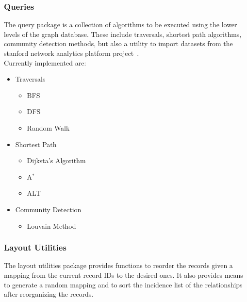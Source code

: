    \subsubsection{Queries}
        The query package is a collection of algorithms to be executed using the lower levels of the graph database. These include traversals, shortest path algorithms, community detection methods, but also a utility to import datasets from the stanford network analytics platform project~\autocite{snap}. \\
        Currently implemented are:
        \begin{itemize}
         \item Traversals
         \begin{itemize}
                \item BFS~\autocite{zuse1948allgemeinen}
                \item DFS~\autocite{lucas1891recreations}
                \item Random Walk~\autocite{pearson1905problem}
               \end{itemize}
         \item Shortest Path
         \begin{itemize}
          \item Dijksta's Algorithm~\autocite{dijkstra1959note}
          \item A$^*$~\autocite{hart1968formal}
          \item ALT~\autocite{goldberg2005computing}
         \end{itemize}
        \item Community Detection
        \begin{itemize}
         \item Louvain Method~\autocite{blondel2008fast}
        \end{itemize}

        \end{itemize}

        
    \subsubsection{Layout Utilities}
    The layout utilities package provides functions to reorder the records given a mapping from the current record IDs to the desired ones. It also provides means to generate a random mapping and to sort the incidence list of the relationships after reorganizing the records.
    
